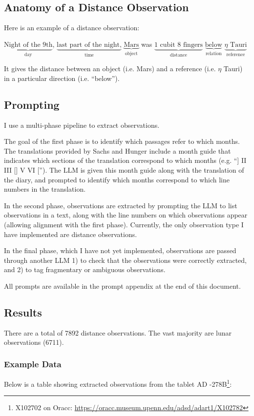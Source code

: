 \documentclass{article}
\newcommand\annotation[2]{\(\underbrace{\text{#1}}_\text{#2}\)}
\begin{document}
\subsection{Anatomy of a Distance Observation}
Here is an example of a distance observation:
\begin{displayquote}
\annotation{Night of the 9th}{day}, \annotation{last part of the night,}{time} \annotation{Mars}{object} was \annotation{1 cubit 8 fingers}{distance} \annotation{below}{relation} \annotation{$\eta$ Tauri}{reference}
\end{displayquote}
It gives the distance between an object (i.e. Mars) and a reference (i.e. $\eta$ Tauri) in a particular direction (i.e. ``below'').

\subsection{Prompting}
I use a multi-phase pipeline to extract observations.

The goal of the first phase is to identify which passages refer to which months. The translations provided by Sachs and Hunger include a month guide that indicates which sections of the translation correspond to which months \autocite{sachsHunger} (e.g. ``] II III [] V VI [''). The LLM is given this month guide along with the translation of the diary, and prompted to identify which months correspond to which line numbers in the translation.

In the second phase, observations are extracted by prompting the LLM to list observations in a text, along with the line numbers on which observations appear (allowing alignment with the first phase). Currently, the only observation type I have implemented are distance observations.

In the final phase, which I have not yet implemented, observations are passed through another LLM 1) to check that the observations were correctly extracted, and 2) to tag fragmentary or ambiguous observations.

All prompts are available in the prompt appendix at the end of this document.

\subsection{Results}
There are a total of 7892 distance observations. The vast majority are lunar observations (6711).

\subsubsection{Example Data}
Below is a table showing extracted observations from the tablet AD -278B\footnote{X102702 on Oracc: \url{https://oracc.museum.upenn.edu/adsd/adart1/X102782}}:
\end{document}
